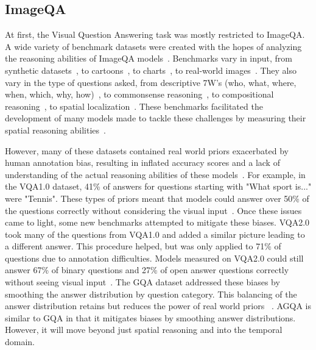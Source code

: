 \documentclass[10pt,twocolumn,letterpaper]{article}
\begin{document}
\subsection{ImageQA}

At first, the Visual Question Answering task was mostly restricted to ImageQA. A wide variety of benchmark datasets were created with the hopes of analyzing the reasoning abilities of ImageQA models~\cite{johnson2017clevr,hudson2019gqa,antol2015vqa,zellers2019recognition,goyal2017making,krishna2017visual,zhu2016visual7w,kim2020answering}. Benchmarks vary in input, from synthetic datasets~\cite{johnson2017clevr}, to cartoons~\cite{antol2015vqa}, to charts~\cite{kim2017deepstory}, to real-world images~\cite{hudson2019gqa,krishna2017visual,zhu2016visual7w,goyal2017making,zellers2019recognition,antol2015vqa}. They also vary in the type of questions asked, from descriptive 7W's (who, what, where, when, which, why, how)~\cite{zhu2016visual7w}, to commonsense reasoning~\cite{zellers2019recognition}, to compositional reasoning~\cite{johnson2017clevr,hudson2019gqa}, to spatial localization~\cite{zhu2016visual7w,krishna2017visual,hudson2019gqa}. These benchmarks facilitated the development of many models made to tackle these challenges by measuring their spatial reasoning abilities~\cite{johnson2017clevr,hudson2019gqa,krishna2017visual,vatashsky2020vqa}. %

However, many of these datasets contained real world priors exacerbated by human annotation bias, resulting in inflated accuracy scores and a lack of understanding of the actual reasoning abilities of these models~\cite{goyal2017making,hudson2019gqa}. For example, in the VQA1.0 dataset, 41\% of answers  for questions starting with "What sport is..." were "Tennis". These types of priors meant that models could answer over 50\% of the questions correctly without considering the visual input~\cite{goyal2017making}. Once these issues came to light, some new benchmarks attempted to mitigate these biases. VQA2.0 took many of the questions from VQA1.0 and added a similar picture leading to a different answer. This procedure helped, but was only applied to 71\% of questions due to annotation difficulties. Models measured on VQA2.0 could still answer 67\% of binary questions and 27\% of open answer questions correctly without seeing visual input~\cite{hudson2019gqa}. The GQA dataset addressed these biases by smoothing the answer distribution by question category. This balancing of the answer distribution retains but reduces the power of real world priors ~\cite{hudson2019gqa}. AGQA is similar to GQA in that it mitigates biases by smoothing answer distributions. However, it will move beyond just spatial reasoning and into the temporal domain. 
\end{document}
